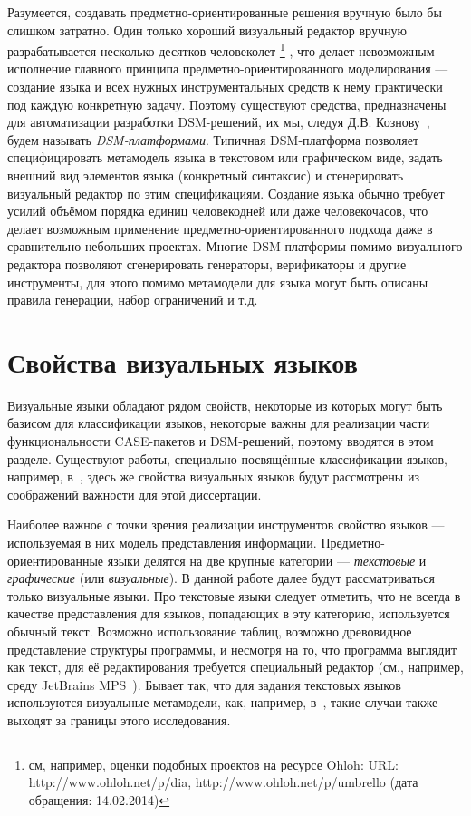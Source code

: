 Разумеется, создавать предметно-ориентированные решения вручную было бы слишком 
затратно. Один только хороший визуальный редактор вручную разрабатывается 
несколько десятков человеколет%
\footnote{см, например, оценки подобных проектов на ресурсе Ohloh: 
URL: http://www.ohloh.net/p/dia, http://www.ohloh.net/p/umbrello (дата обращения: 14.02.2014)}%
, что делает невозможным исполнение главного 
принципа предметно-ориентированного моделирования --- создание языка и всех 
нужных инструментальных средств к нему практически под каждую конкретную задачу. 
Поэтому существуют средства, предназначены для автоматизации разработки 
DSM-решений, их мы, следуя Д.В. Кознову~\cite{koznov2008osnovy}, будем называть \textit{DSM-платформами}. 
Типичная DSM-платформа позволяет специфицировать метамодель языка в текстовом или графическом виде, задать 
внешний вид элементов языка (конкретный синтаксис) и сгенерировать визуальный 
редактор по этим спецификациям. Создание языка обычно требует усилий объёмом 
порядка единиц человекодней или даже человекочасов, что делает возможным 
применение предметно-ориентированного подхода даже в сравнительно небольших 
проектах. Многие DSM-платформы помимо визуального редактора позволяют 
сгенерировать генераторы, верификаторы и другие инструменты, для этого помимо 
метамодели для языка могут быть описаны правила генерации, набор ограничений 
и т.д.

\section{Свойства визуальных языков}
Визуальные языки обладают рядом свойств, некоторые из которых могут быть базисом 
для классификации языков, некоторые важны для реализации части функциональности \ac{CASE}-пакетов 
и \ac{DSM}-решений, поэтому вводятся в этом разделе. Существуют работы, специально
посвящённые классификации языков, например, в~\cite{costagliola2002classification},
здесь же свойства визуальных языков будут рассмотрены из соображений важности для этой диссертации.

Наиболее важное с точки зрения реализации инструментов свойство языков --- 
используемая в них модель представления информации. Предметно-ориентированные 
языки делятся на две крупные категории --- \textit{текстовые} и \textit{графические} 
(или \textit{визуальные}). В данной работе далее будут рассматриваться только визуальные 
языки. Про текстовые языки следует отметить, что не всегда в качестве представления для языков, 
попадающих в эту категорию, используется обычный текст. Возможно использование таблиц, 
возможно древовидное представление структуры программы, и несмотря на то, что программа 
выглядит как текст, для её редактирования требуется специальный редактор (см., например, среду 
JetBrains MPS~\cite{dmitriev2004language}). Бывает так, что для задания текстовых языков используются визуальные метамодели,
как, например, в~\cite{karlsch2007model}, такие случаи также выходят за границы этого исследования.

